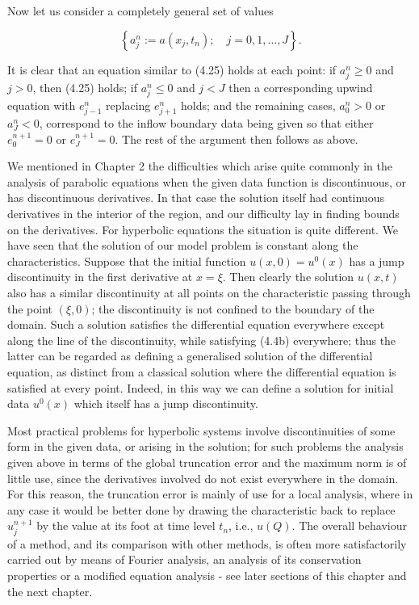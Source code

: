 \documentclass[10pt]{article}
\begin{document}
Now let us consider a completely general set of values

\[
\left\{a_{j}^{n}:=a\left(x_{j}, t_{n}\right) ; \quad j=0,1, \ldots, J\right\} .
\]

It is clear that an equation similar to (4.25) holds at each point: if \(a_{j}^{n} \geq 0\) and \(j>0\), then (4.25) holds; if \(a_{j}^{n} \leq 0\) and \(j<J\) then a corresponding upwind equation with \(e_{j-1}^{n}\) replacing \(e_{j+1}^{n}\) holds; and the remaining cases, \(a_{0}^{n}>0\) or \(a_{J}^{n}<0\), correspond to the inflow boundary data being given so that either \(e_{0}^{n+1}=0\) or \(e_{J}^{n+1}=0\). The rest of the argument then follows as above.

We mentioned in Chapter 2 the difficulties which arise quite commonly in the analysis of parabolic equations when the given data function is discontinuous, or has discontinuous derivatives. In that case the solution itself had continuous derivatives in the interior of the region, and our difficulty lay in finding bounds on the derivatives. For hyperbolic equations the situation is quite different. We have seen that the solution of our model problem is constant along the characteristics. Suppose that the initial function \(u(x, 0)=u^{0}(x)\) has a jump discontinuity in the first derivative at \(x=\xi\). Then clearly the solution \(u(x, t)\) also has a similar discontinuity at all points on the characteristic passing through the point \((\xi, 0)\); the discontinuity is not confined to the boundary of the domain. Such a solution satisfies the differential equation everywhere except along the line of the discontinuity, while satisfying (4.4b) everywhere; thus the latter can be regarded as defining a generalised solution of the differential equation, as distinct from a classical solution where the differential equation is satisfied at every point. Indeed, in this way we can define a solution for initial data \(u^{0}(x)\) which itself has a jump discontinuity.

Most practical problems for hyperbolic systems involve discontinuities of some form in the given data, or arising in the solution; for such problems the analysis given above in terms of the global truncation error and the maximum norm is of little use, since the derivatives involved do not exist everywhere in the domain. For this reason, the truncation error is mainly of use for a local analysis, where in any case it would be better done by drawing the characteristic back to replace \(u_{j}^{n+1}\) by the value at its foot at time level \(t_{n}\), i.e., \(u(Q)\). The overall behaviour of a method, and its comparison with other methods, is often more satisfactorily carried out by means of Fourier analysis, an analysis of its conservation properties or a modified equation analysis - see later sections of this chapter and the next chapter.
\end{document}
